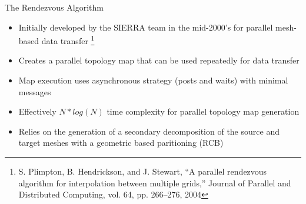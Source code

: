 \documentclass{beamer}
\begin{document}
\begin{frame}{The Rendezvous Algorithm}

  \begin{itemize}
    \item Initially developed by the SIERRA team in the mid-2000's for
      parallel mesh-based data transfer \footnote{S. Plimpton,
        B. Hendrickson, and J. Stewart, “A parallel rendezvous
        algorithm for interpolation between multiple grids,” Journal
        of Parallel and Distributed Computing, vol. 64, pp. 266–276,
        2004}
      \medskip
    \item Creates a parallel topology map that can be used repeatedly
      for data transfer
    \item Map execution uses asynchronous strategy (posts and waits)
      with minimal messages
    \item Effectively $N*log(N)$ time complexity for parallel topology
      map generation
      \medskip
    \item Relies on the generation of a secondary decomposition of the
      source and target meshes with a geometric based paritioning
      (RCB)
  \end{itemize}

\end{frame}
\end{document}
